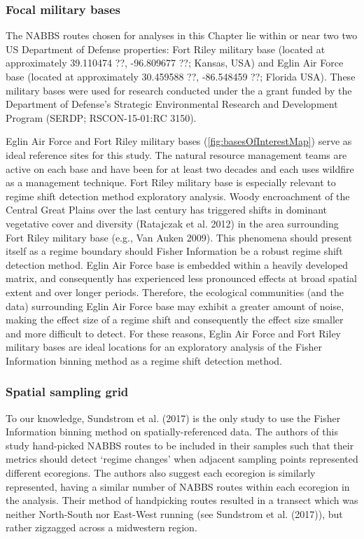 \documentclass[12pt,twoside,openany]{reedthesis}
\begin{document}
\subsubsection{Focal military bases}\label{focal-military-bases}

The NABBS routes chosen for analyses in this Chapter lie within or near
two two US Department of Defense properties: Fort Riley military base
(located at approximately 39.110474 ??, -96.809677 ??; Kansas, USA) and
Eglin Air Force base (located at approximately 30.459588 ??, -86.548459
??; Florida USA). These military bases were used for research conducted
under the a grant funded by the Department of Defense's Strategic
Environmental Research and Development Program (SERDP; RSCON-15-01:RC
3150).

Eglin Air Force and Fort Riley military bases
(\ref{fig:basesOfInterestMap}) serve as ideal reference sites for this
study. The natural resource management teams are active on each base and
have been for at least two decades and each uses wildfire as a
management technique. Fort Riley military base is especially relevant to
regime shift detection method exploratory analysis. Woody encroachment
of the Central Great Plains over the last century has triggered shifts
in dominant vegetative cover and diversity (Ratajczak et al. 2012) in
the area surrounding Fort Riley military base (e.g., Van Auken 2009).
This phenomena should present itself as a regime boundary should Fisher
Information be a robust regime shift detection method. Eglin Air Force
base is embedded within a heavily developed matrix, and consequently has
experienced less pronounced effects at broad spatial extent and over
longer periods. Therefore, the ecological communities (and the data)
surrounding Eglin Air Force base may exhibit a greater amount of noise,
making the effect size of a regime shift and consequently the effect
size smaller and more difficult to detect. For these reasons, Eglin Air
Force and Fort Riley military bases are ideal locations for an
exploratory analysis of the Fisher Information binning method as a
regime shift detection method.

\subsubsection{Spatial sampling grid}\label{spatial-sampling-grid}

To our knowledge, Sundstrom et al. (2017) is the only study to use the
Fisher Information binning method on spatially-referenced data. The
authors of this study hand-picked NABBS routes to be included in their
samples such that their metrics should detect `regime changes' when
adjacent sampling points represented different ecoregions. The authors
also suggest each ecoregion is similarly represented, having a similar
number of NABBS routes within each ecoregion in the analysis. Their
method of handpicking routes resulted in a transect which was neither
North-South nor East-West running (see Sundstrom et al. (2017)), but
rather zigzagged across a midwestern region.
\end{document}
